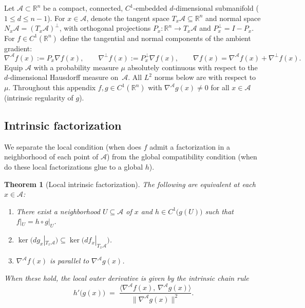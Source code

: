 \documentclass{article}
\newtheorem{theorem}{Theorem}
\begin{document}
Let $\mathcal{A}\subset\mathbb{R}^n$ be a compact, connected, $C^1$-embedded
$d$-dimensional submanifold ($1\le d \le n-1$). For $x\in\mathcal{A}$,
denote the tangent space $T_x\mathcal{A}\subseteq\mathbb{R}^n$
and normal space $N_x\mathcal{A} = (T_x\mathcal{A})^\perp$, with orthogonal
projections $P_x:\mathbb{R}^n\to T_x\mathcal{A}$ and
$P_x^\perp = I - P_x$. For $f\in C^1(\mathbb{R}^n)$ define the tangential
and normal components of the ambient gradient:
$$
  \nabla^{\!\mathcal{A}} f(x) := P_x\nabla f(x),
  \qquad
  \nabla^{\!\perp} f(x) := P_x^\perp\nabla f(x),
  \qquad
  \nabla f(x) = \nabla^{\!\mathcal{A}} f(x)+\nabla^{\!\perp} f(x).
$$
Equip $\mathcal{A}$ with a probability measure $\mu$ absolutely continuous
with respect to the $d$-dimensional Hausdorff measure on~$\mathcal{A}$. All
$L^2$ norms below are with respect to~$\mu$. Throughout this appendix
$f, g\in C^1(\mathbb{R}^n)$ with $\nabla^{\!\mathcal{A}} g(x)\neq 0$ for all
$x\in\mathcal{A}$ (intrinsic regularity of $g$).

\subsection{Intrinsic factorization}

We separate the local condition (when does $f$ admit a factorization in a
neighborhood of each point of $\mathcal{A}$) from the global compatibility
condition (when do these local factorizations glue to a global $h$).

\begin{theorem}[Local intrinsic factorization]
\label{thm:intrinsic-fact}
The following are equivalent at each $x\in\mathcal{A}$:
\begin{enumerate}
  \item[(i)] There exist a neighborhood $U\subseteq\mathcal{A}$ of $x$ and
    $h\in C^1\bigl(g(U)\bigr)$ such that $f|_U = h\circ g|_U$.
  \item[(ii)] $\ker\!\bigl(dg_x|_{T_x\mathcal{A}}\bigr)\subseteq
    \ker\!\bigl(df_x|_{T_x\mathcal{A}}\bigr)$.
  \item[(iii)] $\nabla^{\!\mathcal{A}} f(x)$ is parallel to
    $\nabla^{\!\mathcal{A}} g(x)$.
\end{enumerate}
When these hold, the local outer derivative is given by the
\emph{intrinsic chain rule}
\begin{equation}
\label{eq:intrinsic-hprime}
  h'\bigl(g(x)\bigr) \;=\;
    \frac{\langle\nabla^{\!\mathcal{A}} f(x),\,\nabla^{\!\mathcal{A}} g(x)\rangle}
         {\|\nabla^{\!\mathcal{A}} g(x)\|^2}.
\end{equation}
\end{theorem}
\end{document}
